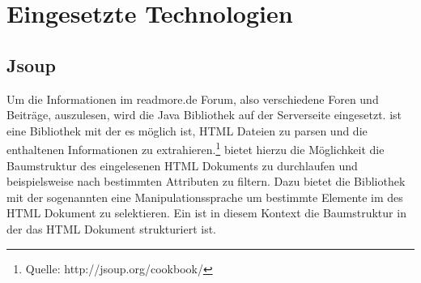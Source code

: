 \section{Eingesetzte Technologien}
\subsection{Jsoup}
Um die Informationen im readmore.de Forum, also verschiedene Foren und Beiträge,
auszulesen, wird die Java Bibliothek  auf der
Serverseite eingesetzt.
 ist eine Bibliothek mit der es möglich ist, HTML Dateien zu
parsen und die enthaltenen Informationen zu
extrahieren.\footnote{Quelle: http://jsoup.org/cookbook/} 
bietet hierzu die Möglichkeit die Baumstruktur des eingelesenen HTML Dokuments zu durchlaufen und beispielsweise nach bestimmten Attributen zu filtern. Dazu
bietet die Bibliothek mit der sogenannten  eine
Manipulationssprache um bestimmte Elemente im  des HTML
Dokument zu selektieren. Ein  ist in diesem Kontext die 
Baumstruktur in der das HTML Dokument strukturiert ist. \\
